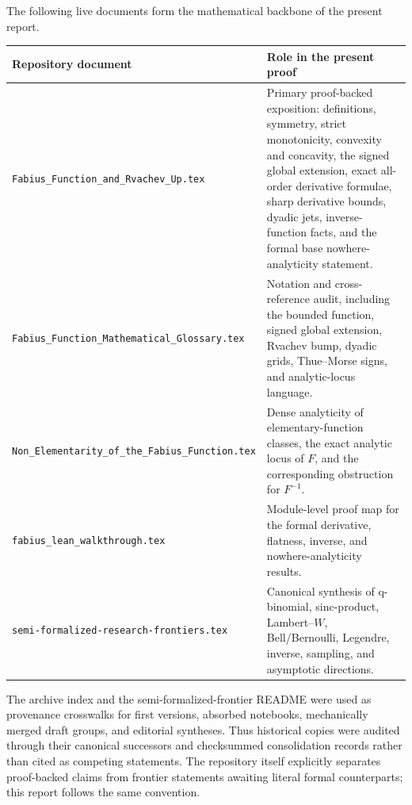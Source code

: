 \documentclass[11pt,oneside]{article}
\theoremstyle{definition}
\theoremstyle{remark}
\begin{document}
The following live documents form the mathematical backbone of the present report.
\begin{longtable}{@{}p{}p{}@{}}
\toprule
Repository document & Role in the present proof \\
\midrule
\endhead
\texttt{Fabius\_Function\_and\_}\newline\texttt{Rvachev\_Up.tex}
& Primary proof-backed exposition: definitions, symmetry, strict monotonicity,
convexity and concavity, the signed global extension, exact all-order derivative
formulae, sharp derivative bounds, dyadic jets, inverse-function facts, and the
formal base nowhere-analyticity statement.\\[0.4em]
\texttt{Fabius\_Function\_}\newline\texttt{Mathematical\_}\newline\texttt{Glossary.tex}
& Notation and cross-reference audit, including the bounded function, signed global
extension, Rvachev bump, dyadic grids, Thue--Morse signs, and analytic-locus language.\\[0.4em]
\texttt{Non\_Elementarity\_}\newline\texttt{of\_the\_Fabius\_}\newline\texttt{Function.tex}
& Dense analyticity of elementary-function classes, the exact analytic locus of $F$,
and the corresponding obstruction for $F^{-1}$.\\[0.4em]
\texttt{fabius\_lean\_}\newline\texttt{walkthrough.tex}
& Module-level proof map for the formal derivative, flatness, inverse, and
nowhere-analyticity results.\\[0.4em]
\texttt{semi-formalized-}\newline\texttt{research-frontiers.tex}
& Canonical synthesis of q-binomial, sinc-product, Lambert--$W$, Bell/Bernoulli,
Legendre, inverse, sampling, and asymptotic directions.\\[0.4em]
\bottomrule
\end{longtable}

The archive index and the semi-formalized-frontier README were used as provenance
crosswalks for first versions, absorbed notebooks, mechanically merged draft groups,
and editorial syntheses.  Thus historical copies were audited through their canonical
successors and checksummed consolidation records rather than cited as competing
statements.  The repository itself explicitly separates proof-backed claims from
frontier statements awaiting literal formal counterparts; this report follows the
same convention.
\end{document}
